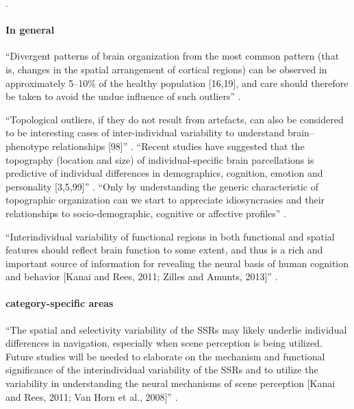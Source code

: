 .


\paragraph{In general}

``Divergent patterns of brain organization from the most common pattern (that
is, changes in the spatial arrangement of cortical regions) can be observed in
approximately 5–10\% of the healthy population [16,19], and care should
therefore be taken to avoid the undue influence of such outliers''
\citep{eickhoff2018imaging}.

%
``Topological outliers, if they do not result from artefacts, can also be
considered to be interesting cases of inter-individual variability to understand
brain–phenotype relationships [98]'' \citep{eickhoff2018imaging}.
%
``Recent studies have suggested that the topography (location and size)
of individual-specific brain parcellations is predictive of individual
differences in demographics, cognition, emotion and personality [3,5,99]''
\citep{eickhoff2018imaging}.
%
``Only by understanding the generic characteristic of topographic organization
can we start to appreciate idiosyncrasies and their relationships to
socio-demographic, cognitive or affective profiles''
\citep{eickhoff2018imaging}.

``Interindividual variability of functional regions in both functional and
spatial features should reflect brain function to some extent, and thus is a
rich and important source of information for revealing the neural basis of human
cognition and behavior [Kanai and Rees, 2011; Zilles and Amunts, 2013]''
\citep{zhen2015quantifying}.


\paragraph{category-specific areas}


``The spatial and selectivity variability of the SSRs may likely underlie
individual differences in navigation, especially when scene perception is being
utilized.
%
Future studies will be needed to elaborate on the mechanism and functional
significance of the interindividual variability of the SSRs and to utilize the
variability in understanding the neural mechanisms of scene perception [Kanai
and Rees, 2011; Van Horn et al., 2008]'' \citep{zhen2017quantifying}.

